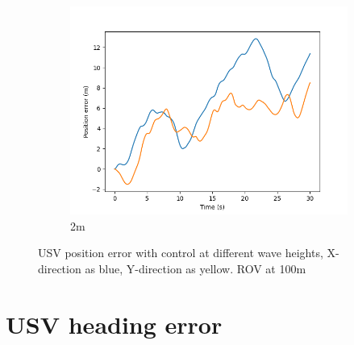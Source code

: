 \documentclass[class=article, crop=false]{standalone}
\begin{document}
\begin{figure}
\begin{subfigure}[b]{0.48\textwidth}
        \includegraphics{scenario1/rov-100m/2.0m/usv_pos_error_controlled}
        \caption{2m}
        \label{}
    \end{subfigure}
    \caption{USV position error with control at different wave heights, X-direction as blue, Y-direction as yellow. ROV at 100m}
    \label{}
\end{figure}
\FloatBarrier
\section{USV heading error}
\end{document}
